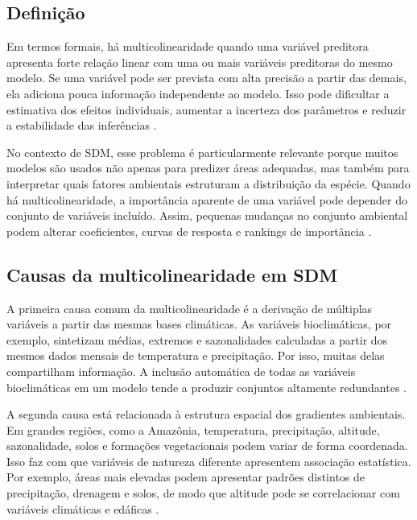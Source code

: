 \subsection{Definição}

Em termos formais, há multicolinearidade quando uma variável preditora apresenta forte relação linear com uma ou mais variáveis preditoras do mesmo modelo. Se uma variável pode ser prevista com alta precisão a partir das demais, ela adiciona pouca informação independente ao modelo. Isso pode dificultar a estimativa dos efeitos individuais, aumentar a incerteza dos parâmetros e reduzir a estabilidade das inferências \parencite{dormann2013collinearity}.

No contexto de SDM, esse problema é particularmente relevante porque muitos modelos são usados não apenas para predizer áreas adequadas, mas também para interpretar quais fatores ambientais estruturam a distribuição da espécie. Quando há multicolinearidade, a importância aparente de uma variável pode depender do conjunto de variáveis incluído. Assim, pequenas mudanças no conjunto ambiental podem alterar coeficientes, curvas de resposta e rankings de importância \parencite{guisan2017habitat,zurell2020standard}.

\subsection{Causas da multicolinearidade em SDM}

A primeira causa comum da multicolinearidade é a derivação de múltiplas variáveis a partir das mesmas bases climáticas. As variáveis bioclimáticas, por exemplo, sintetizam médias, extremos e sazonalidades calculadas a partir dos mesmos dados mensais de temperatura e precipitação. Por isso, muitas delas compartilham informação. A inclusão automática de todas as variáveis bioclimáticas em um modelo tende a produzir conjuntos altamente redundantes \parencite{booth2014bioclim,dormann2013collinearity}.

A segunda causa está relacionada à estrutura espacial dos gradientes ambientais. Em grandes regiões, como a Amazônia, temperatura, precipitação, altitude, sazonalidade, solos e formações vegetacionais podem variar de forma coordenada. Isso faz com que variáveis de natureza diferente apresentem associação estatística. Por exemplo, áreas mais elevadas podem apresentar padrões distintos de precipitação, drenagem e solos, de modo que altitude pode se correlacionar com variáveis climáticas e edáficas \parencite{franklin2010mapping,guisan2017habitat}.

